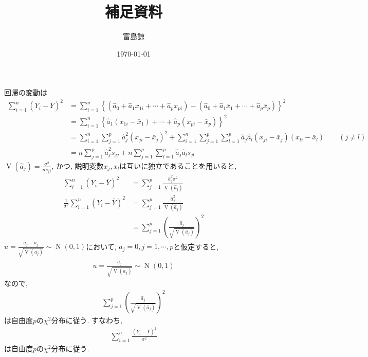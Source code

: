 \documentclass[a4paper,11pt,dvipdfmx]{jsarticle}
\begin{document}
\title{\vspace{-2cm}補足資料}
\author{富島諒}
\date{\today}

\maketitle

回帰の変動は
\begin{align*}
  \sum_{i=1}^{n}(Y_i-\bar{Y})^2
  &= \sum_{i=1}^{n}\left\{
    (\hat{a}_0 + \hat{a}_{1}x_{1i} + \cdots + \hat{a}_{p}x_{pi})
    - (\hat{a}_0 + \hat{a}_{1}\bar{x}_1 + \cdots + \hat{a}_{p}\bar{x}_p)
  \right\}^2 \\
  &= \sum_{i=1}^{n} \left\{
    \hat{a}_1(x_{1i}-\bar{x}_1) + \cdots + \hat{a}_p(x_{pi}-\bar{x}_p)
  \right\}^2 \\
  &= \sum_{i=1}^{n} \sum_{j=1}^p \hat{a}_j^2(x_{ji} - \bar{x}_{j})^2
  + \sum_{i=1}^n\sum_{j=1}^p\sum_{l=1}^p \hat{a}_j\hat{a}_l(x_{ji}-\bar{x}_{j})(x_{li}-\bar{x}_l) \qquad (j\neq l)\\
  &= n\sum_{j=1}^p \hat{a}_j^2s_{jj} 
  + n\sum_{j=1}^p\sum_{l=1}^p\hat{a}_j\hat{a}_ls_{jl} 
\end{align*}
$\operatorname{V}(\hat{a}_j)=\frac{\sigma^2}{ns_{jj}}$, かつ, 説明変数$x_j, x_l$は互いに独立であることを用いると, 
\begin{align*}
  \sum_{i=1}^{n}(Y_i-\bar{Y})^2
  &= \sum_{j=1}^p\frac{\hat{a}_j^2\sigma^2}{\operatorname{V}(\hat{a}_j)} \\
  \frac{1}{\sigma^2}\sum_{i=1}^{n}(Y_i-\bar{Y})^2 
  &= \sum_{j=1}^p\frac{\hat{a}_j^2}{\operatorname{V}(\hat{a}_j)} \\
  &= \sum_{j=1}^p\left( \frac{\hat{a}_j}{\sqrt{\operatorname{V}(\hat{a}_j)}} \right)^2
\end{align*}
$u = \frac{\hat{a}_j -a_j}{\sqrt{\operatorname{V}(a_j)}}\sim \operatorname{N}(0, 1)$において, $a_j=0, j=1, \cdots, p$と仮定すると, 
\begin{align*}
  u= \frac{\hat{a}_j}{\sqrt{\operatorname{V}(a_j)}} \sim \operatorname{N}(0, 1)
\end{align*}
なので, 
\begin{align*}
  \sum_{j=1}^p\left( \frac{\hat{a}_j}{\sqrt{\operatorname{V}(\hat{a}_j)}} \right)^2
\end{align*}
は自由度$p$の$\chi^2$分布に従う. すなわち,
\begin{align*}
  \sum_{i=1}^n\frac{(Y_i - \bar{Y})^2}{\sigma^2}
\end{align*}
は自由度$p$の$\chi^2$分布に従う.
\end{document}

